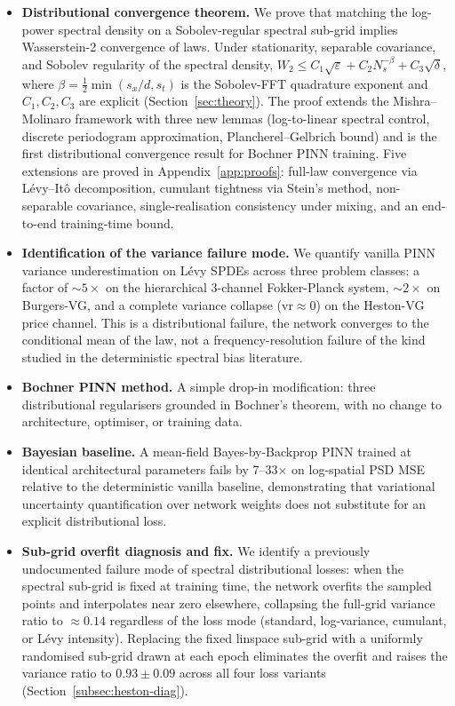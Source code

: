 \documentclass[review,12pt]{elsarticle}
\begin{document}
\begin{itemize}
\item \textbf{Distributional convergence theorem.} We prove that
matching the log-power spectral density on a Sobolev-regular spectral
sub-grid implies Wasserstein-2 convergence of laws. Under stationarity,
separable covariance, and Sobolev regularity of the spectral density,
\(W_2 \leq C_1\sqrt{\varepsilon} + C_2 N_s^{-\beta} + C_3\sqrt{\delta}\),
where \(\beta = \tfrac{1}{2}\min(s_x/d, s_t)\) is the Sobolev-FFT
quadrature exponent and \(C_1, C_2, C_3\) are explicit
(Section~\ref{sec:theory}). The proof extends the Mishra--Molinaro
framework with three new lemmas (log-to-linear spectral control,
discrete periodogram approximation, Plancherel--Gelbrich bound) and is
the first distributional convergence result for Bochner PINN training.
Five extensions are proved in Appendix~\ref{app:proofs}: full-law
convergence via L\'evy--It\^o decomposition, cumulant tightness via
Stein's method, non-separable covariance, single-realisation
consistency under mixing, and an end-to-end training-time bound.

\item \textbf{Identification of the variance failure mode.} We quantify
vanilla PINN variance underestimation on L\'evy SPDEs across three
problem classes: a factor of \(\sim 5\times\) on the hierarchical
3-channel Fokker-Planck system, \(\sim 2\times\) on Burgers-VG, and a
complete variance collapse (\(\mathrm{vr} \approx 0\)) on the
Heston-VG price channel. This is a distributional failure, the
network converges to the conditional mean of the law, not a
frequency-resolution failure of the kind studied in the deterministic
spectral bias literature.

\item \textbf{Bochner PINN method.} A simple drop-in modification:
three distributional regularisers grounded in Bochner's theorem, with
no change to architecture, optimiser, or training data.

\item \textbf{Bayesian baseline.} A mean-field Bayes-by-Backprop PINN
trained at identical architectural parameters fails by 7--33\(\times\)
on log-spatial PSD MSE relative to the deterministic vanilla baseline,
demonstrating that variational uncertainty quantification over network
weights does not substitute for an explicit distributional loss.

\item \textbf{Sub-grid overfit diagnosis and fix.} We identify a
previously undocumented failure mode of spectral distributional
losses: when the spectral sub-grid is fixed at training time, the
network overfits the sampled points and interpolates near zero
elsewhere, collapsing the full-grid variance ratio to \(\approx 0.14\)
regardless of the loss mode (standard, log-variance, cumulant, or
L\'evy intensity). Replacing the fixed linspace sub-grid with a
uniformly randomised sub-grid drawn at each epoch eliminates the
overfit and raises the variance ratio to \(0.93 \pm 0.09\) across all
four loss variants (Section~\ref{subsec:heston-diag}).


\end{itemize}
\end{document}
